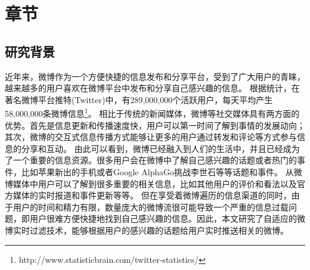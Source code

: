 \chapter{章节}
\section{研究背景}
    近年来，微博作为一个方便快捷的信息发布和分享平台，受到了广大用户的青睐，越来越多的用户喜欢在微博平台中发布和分享自己感兴趣的信息。
    根据统计，在著名微博平台推特(Twitter)中，有289,000,000个活跃用户，每天平均产生58,000,000条微博信息\footnote{http://www.statisticbrain.com/twitter-statistics/}。
    相比于传统的新闻媒体，微博等社交媒体具有两方面的优势。首先是信息更新和传播速度快，用户可以第一时间了解到事情的发展动向；其次，微博的交互式信息传播方式能够让更多的用户通过转发和评论等方式参与信息的分享和互动。
    由此可以看到，微博已经融入到人们的生活中，并且已经成为了一个重要的信息资源。很多用户会在微博中了解自己感兴趣的话题或者热门的事件，比如苹果新出的手机或者Google AlphaGo挑战李世石等等话题和事件。
    从微博媒体中用户可以了解到很多重要的相关信息，比如其他用户的评价和看法以及官方媒体的实时报道和事件更新等等。
    但在享受着微博遍历的信息渠道的同时，由于用户的时间和精力有限，数量庞大的微博流很可能导致一个严重的信息过载问题，即用户很难方便快捷地找到自己感兴趣的信息。因此，本文研究了自适应的微博实时过滤技术，能够根据用户的感兴趣的话题给用户实时推送相关的微博。
